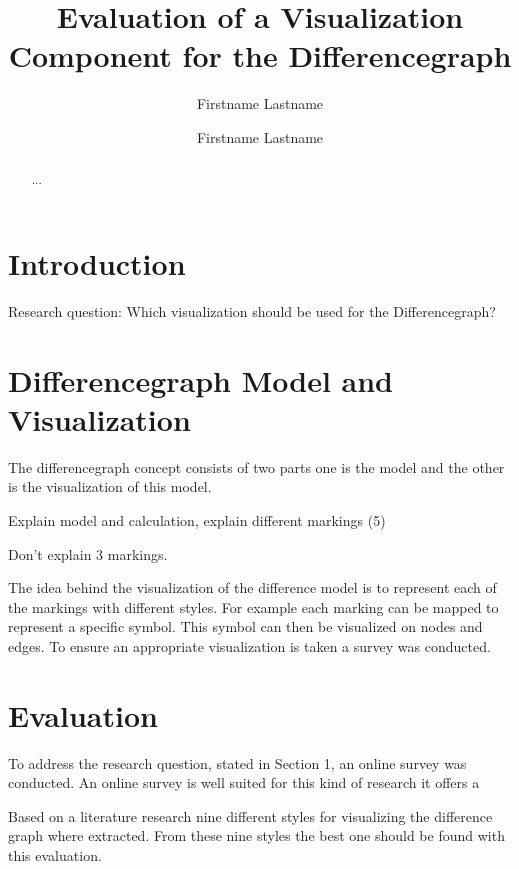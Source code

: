 \documentclass{llncs}
\begin{document}
\title{Evaluation of a Visualization Component for the Differencegraph}
\author{Firstname Lastname \and Firstname Lastname}
\maketitle
\begin{abstract}
...
\end{abstract}

\section{Introduction}
\label{sec:Introduction}

Research question: Which visualization should be used for the Differencegraph?





\section{Differencegraph Model and Visualization}
\label{sec:DiffgraphModel}
The differencegraph concept \cite{lit:VisuApprDiffAnalysis} consists of two parts one is the model and the other is the visualization of this model.

Explain model and calculation, explain different markings (5)

Don't explain 3 markings. 




The idea behind the visualization of the difference model is to represent each of the markings with different styles. For example each marking can be mapped to represent a specific symbol. This symbol can then be visualized on nodes and edges. To ensure an appropriate visualization is taken a survey was conducted.



\section{Evaluation}
\label{sec:Evaluation}
To address the research question, stated in Section 1, an online survey was conducted. An online survey is well suited for this kind of research it offers a 

Based on a literature research nine different styles for visualizing the difference graph where extracted. From these nine styles the best one should be found with this evaluation.
\end{document}
